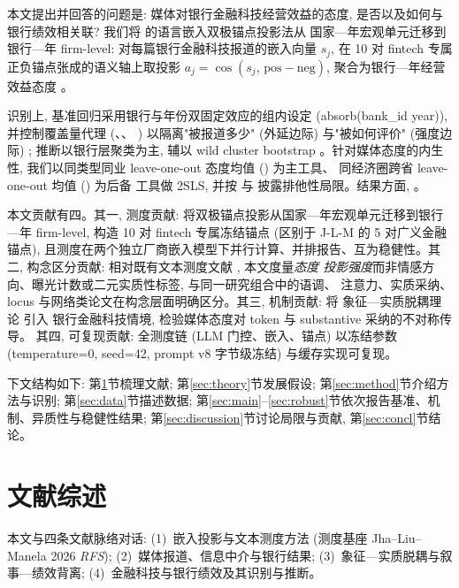 本文提出并回答的问题是: 媒体对银行金融科技经营效益的态度, 是否以及如何与
银行绩效相关联? 我们将 \textcite{jha2026benefit} 的语言嵌入双极锚点投影法从
国家—年宏观单元迁移到银行—年 firm-level: 对每篇银行金融科技报道的嵌入向量
$s_j$, 在 10 对 fintech 专属正负锚点张成的语义轴上取投影
$a_j=\cos(s_j,\,\mathrm{pos}-\mathrm{neg})$, 聚合为银行—年经营效益态度
。

识别上, 基准回归采用银行与年份双固定效应的组内设定 (absorb(bank\_id year)),
并控制覆盖量代理 (、、
) 以隔离"被报道多少" (外延边际) 与"被如何评价" (强度边际)
\parencite{fang2009media}; 推断以银行层聚类为主, 辅以 wild cluster bootstrap
\parencite{roodman2019boottest}。针对媒体态度的内生性, 我们以同类型同业
leave-one-out 态度均值 () 为主工具、
同经济圈跨省 leave-one-out 均值 () 为后备
工具做 2SLS, 并按 \textcite{manski1993reflection} 与 \textcite{leary2014peer}
披露排他性局限。结果方面, \@。

本文贡献有四。其一, 测度贡献: 将双极锚点投影从国家—年宏观单元迁移到银行—年
firm-level, 构造 10 对 fintech 专属冻结锚点 (区别于 J-L-M 的 5 对广义金融
锚点), 且测度在两个独立厂商嵌入模型下并行计算、并排报告、互为稳健性。其二,
构念区分贡献: 相对既有文本测度文献
\parencite{gentzkow2019text,li2021culture,hoberg2016text}, 本文度量\emph{态度
投影强度}而非情感方向、曝光计数或二元实质性标签, 与同一研究组合中的语调、
注意力、实质采纳、locus 与网络类论文在构念层面明确区分。其三, 机制贡献: 将
象征—实质脱耦理论 \parencite{westphal1994substance,fiss2006symbolic} 引入
银行金融科技情境, 检验媒体态度对 token 与 substantive 采纳的不对称传导。
其四, 可复现贡献: 全测度链 (LLM 门控、嵌入、锚点) 以冻结参数
(temperature=0, seed=42, prompt v8 字节级冻结) 与缓存实现可复现。

下文结构如下: 第\ref{sec:lit}节梳理文献; 第\ref{sec:theory}节发展假设;
第\ref{sec:method}节介绍方法与识别; 第\ref{sec:data}节描述数据;
第\ref{sec:main}--\ref{sec:robust}节依次报告基准、机制、异质性与稳健性结果;
第\ref{sec:discussion}节讨论局限与贡献, 第\ref{sec:concl}节结论。

\section{文献综述}\label{sec:lit}
本文与四条文献脉络对话: (1)~嵌入投影与文本测度方法 (测度基座
Jha--Liu--Manela 2026 \emph{RFS}); (2)~媒体报道、信息中介与银行结果;
(3)~象征—实质脱耦与叙事—绩效背离; (4)~金融科技与银行绩效及其识别与推断。

